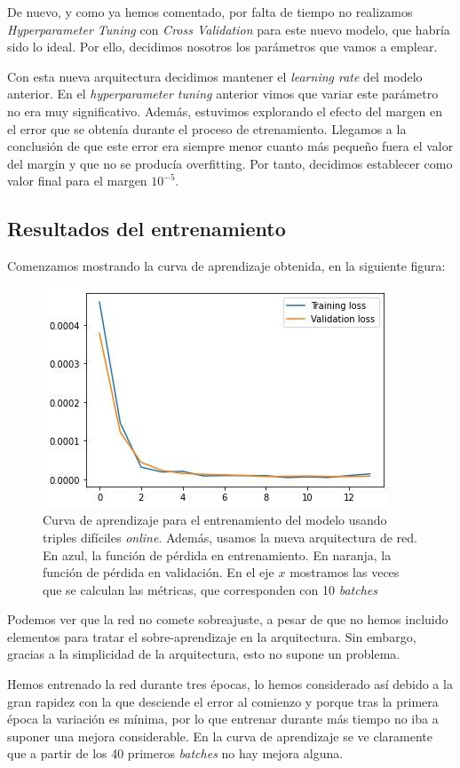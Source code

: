 \documentclass[11pt]{article}
\begin{document}
De nuevo, y como ya hemos comentado, por falta de tiempo no realizamos \emph{Hyperparameter Tuning} con \emph{Cross Validation} para este nuevo modelo, que habría sido lo ideal. Por ello, decidimos nosotros los parámetros que vamos a emplear.

Con esta nueva arquitectura decidimos mantener el \emph{learning rate} del modelo anterior. En el \emph{hyperparameter tuning} anterior vimos que variar este parámetro no era muy significativo. Además, estuvimos explorando el efecto del margen en el error que se obtenía durante el proceso de etrenamiento. Llegamos a la conclusión de que este error era siempre menor cuanto más pequeño fuera el valor del margin y que no se producía overfitting. Por tanto, decidimos establecer como valor final para el margen $10^{-5}$.

\subsection{Resultados del entrenamiento}

Comenzamos mostrando la curva de aprendizaje obtenida, en la siguiente figura:

\begin{figure}[H]
    \centering
    \includegraphics[width = 0.5 \textwidth]{triples_light_curva_aprendizje}
    \caption{Curva de aprendizaje para el entrenamiento del modelo usando triples difíciles \emph{online}. Además, usamos la nueva arquitectura de red. En azul, la función de pérdida en entrenamiento. En naranja, la función de pérdida en validación. En el eje $x$ mostramos las veces que se calculan las métricas, que corresponden con 10 \emph{batches}}
\end{figure}

Podemos ver que la red no comete sobreajuste, a pesar de que no hemos incluido elementos para tratar el sobre-aprendizaje en la arquitectura. Sin embargo, gracias a la simplicidad de la arquitectura, esto no supone un problema.

Hemos entrenado la red durante tres épocas, lo hemos considerado así debido a la gran rapidez con la que desciende el error  al comienzo y porque tras la primera época la variación es mínima, por lo que entrenar durante más tiempo no iba a suponer una mejora considerable. En la curva de aprendizaje se ve claramente que a partir de los 40 primeros \emph{batches} no hay mejora alguna.
\end{document}
